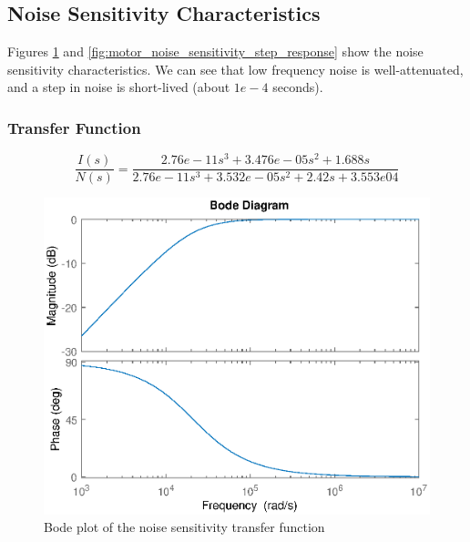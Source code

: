 \documentclass{report}
\begin{document}
\subsection{Noise Sensitivity Characteristics}
Figures \ref{fig:motor_noise_sensitivity_bode} and \ref{fig:motor_noise_sensitivity_step_response} show the noise sensitivity characteristics. We can see that low frequency noise is well-attenuated, and a step in noise is short-lived (about $1e-4$ seconds).
\subsubsection{Transfer Function}
\begin{equation}
\frac{I(s)}{N(s)} = \frac{2.76e-11 s^3 + 3.476e-05 s^2 + 1.688 s}{2.76e-11 s^3 + 3.532e-05 s^2 + 2.42 s + 3.553e04}
\end{equation}

\begin{figure}[h]
\centering
\includegraphics[scale=0.6]{motor_noise_sensitivity_bode}	
\caption{Bode plot of the noise sensitivity transfer function}
\label{fig:motor_noise_sensitivity_bode}
\end{figure}
\end{document}

